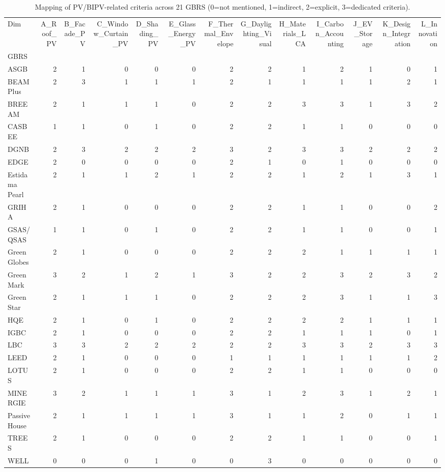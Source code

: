 \begin{table}
\caption{Mapping of PV/BIPV-related criteria across 21 GBRS (0=not mentioned, 1=indirect, 2=explicit, 3=dedicated criteria).}
\label{tab:mapping_matrix}
\begin{tabular}{lrrrrrrrrrrrr}
\toprule
Dim & A_Roof_PV & B_Facade_PV & C_Window_Curtain_PV & D_Shading_PV & E_Glass_Energy_PV & F_Thermal_Envelope & G_Daylighting_Visual & H_Materials_LCA & I_Carbon_Accounting & J_EV_Storage & K_Design_Integration & L_Innovation \\
GBRS &  &  &  &  &  &  &  &  &  &  &  &  \\
\midrule
ASGB & 2 & 1 & 0 & 0 & 0 & 2 & 2 & 1 & 2 & 1 & 0 & 1 \\
BEAM Plus & 2 & 3 & 1 & 1 & 1 & 2 & 1 & 1 & 1 & 1 & 2 & 1 \\
BREEAM & 2 & 1 & 1 & 1 & 0 & 2 & 2 & 3 & 3 & 1 & 3 & 2 \\
CASBEE & 1 & 1 & 0 & 1 & 0 & 2 & 2 & 1 & 1 & 0 & 0 & 0 \\
DGNB & 2 & 3 & 2 & 2 & 2 & 3 & 2 & 3 & 3 & 2 & 2 & 2 \\
EDGE & 2 & 0 & 0 & 0 & 0 & 2 & 1 & 0 & 1 & 0 & 0 & 0 \\
Estidama Pearl & 2 & 1 & 1 & 2 & 1 & 2 & 2 & 1 & 2 & 1 & 3 & 1 \\
GRIHA & 2 & 1 & 0 & 0 & 0 & 2 & 2 & 1 & 1 & 0 & 0 & 2 \\
GSAS/QSAS & 1 & 1 & 0 & 1 & 0 & 2 & 2 & 1 & 1 & 0 & 0 & 1 \\
Green Globes & 2 & 1 & 0 & 0 & 0 & 2 & 2 & 2 & 1 & 1 & 1 & 1 \\
Green Mark & 3 & 2 & 1 & 2 & 1 & 3 & 2 & 2 & 3 & 2 & 3 & 2 \\
Green Star & 2 & 1 & 1 & 1 & 0 & 2 & 2 & 2 & 3 & 1 & 1 & 3 \\
HQE & 2 & 1 & 0 & 1 & 0 & 2 & 2 & 2 & 2 & 1 & 1 & 1 \\
IGBC & 2 & 1 & 0 & 0 & 0 & 2 & 2 & 1 & 1 & 1 & 0 & 1 \\
LBC & 3 & 3 & 2 & 2 & 2 & 2 & 2 & 3 & 3 & 2 & 3 & 3 \\
LEED & 2 & 1 & 0 & 0 & 0 & 1 & 1 & 1 & 1 & 1 & 1 & 2 \\
LOTUS & 2 & 1 & 0 & 0 & 0 & 2 & 2 & 1 & 1 & 0 & 0 & 0 \\
MINERGIE & 3 & 2 & 1 & 1 & 1 & 3 & 1 & 2 & 3 & 1 & 2 & 1 \\
Passive House & 2 & 1 & 1 & 1 & 1 & 3 & 1 & 1 & 2 & 0 & 1 & 1 \\
TREES & 2 & 1 & 0 & 0 & 0 & 2 & 2 & 1 & 1 & 0 & 0 & 1 \\
WELL & 0 & 0 & 0 & 1 & 0 & 0 & 3 & 0 & 0 & 0 & 0 & 0 \\
\bottomrule
\end{tabular}
\end{table}
